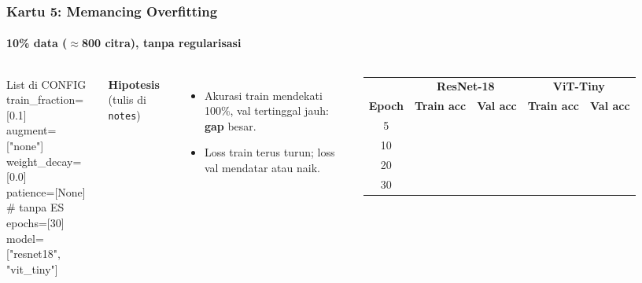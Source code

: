 \documentclass[t,aspectratio=169,xcolor={dvipsnames,table}]{beamer}
\begin{document}
\begin{frame}
    \frametitle{Kartu 5: Memancing Overfitting}
    \framesubtitle{10\% data ($\approx$800 citra), tanpa regularisasi}
    \footnotesize

    \begin{columns}[T]
        \begin{block}{List di CONFIG}
            {\ttfamily\scriptsize train\_fraction=[0.1]\\augment=["none"]\\weight\_decay=[0.0]\\patience=[None]  \# tanpa ES\\epochs=[30]\\model=["resnet18", "vit\_tiny"]}
        \end{block}
        \textbf{Hipotesis} (tulis di \texttt{notes})
        \begin{itemize}
            \item Akurasi train mendekati 100\%, val tertinggal jauh: \textbf{gap} besar.
            \item Loss train terus turun; loss val mendatar atau naik.
        \end{itemize}

        \vspace{2pt}
        \scriptsize
        \setlength{\tabcolsep}{4pt}
        \renewcommand{\arraystretch}{1.6}
        \begin{tabular}{|c|c|c|c|c|}
            \rowcolor{dlSoftCloud} & \multicolumn{2}{c|}{\textbf{ResNet-18}} & \multicolumn{2}{c|}{\textbf{ViT-Tiny}} \\
            \rowcolor{dlSoftCloud} \textbf{Epoch} & \textbf{Train acc} & \textbf{Val acc} & \textbf{Train acc} & \textbf{Val acc} \\ \hline
            5 & \hspace{0.75cm} & \hspace{0.75cm} & \hspace{0.75cm} & \hspace{0.75cm} \\ \hline
            10 & \hspace{0.75cm} & \hspace{0.75cm} & \hspace{0.75cm} & \hspace{0.75cm} \\ \hline
            20 & \hspace{0.75cm} & \hspace{0.75cm} & \hspace{0.75cm} & \hspace{0.75cm} \\ \hline
            30 & \hspace{0.75cm} & \hspace{0.75cm} & \hspace{0.75cm} & \hspace{0.75cm} \\ \hline
        \end{tabular}


\end{columns}
\end{frame}
\end{document}
